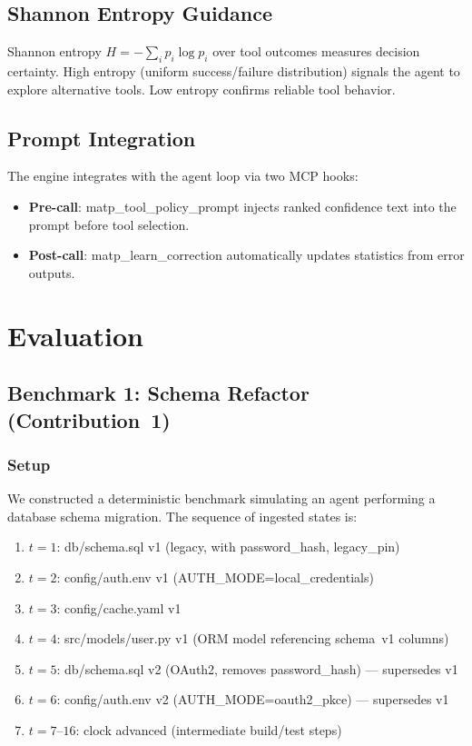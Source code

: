 \documentclass[lettersize,journal]{IEEEtran}
\begin{document}
\subsection{Shannon Entropy Guidance}

Shannon entropy $H = -\sum_i p_i \log p_i$ over tool outcomes measures decision certainty. High entropy (uniform success/failure distribution) signals the agent to explore alternative tools. Low entropy confirms reliable tool behavior.

\subsection{Prompt Integration}

The engine integrates with the agent loop via two MCP hooks:
\begin{itemize}
    \item \textbf{Pre-call}: matp\_tool\_policy\_prompt injects ranked confidence text into the prompt before tool selection.
    \item \textbf{Post-call}: matp\_learn\_correction automatically updates statistics from error outputs.
\end{itemize}

\section{Evaluation}

\subsection{Benchmark 1: Schema Refactor (Contribution~1)}

\subsubsection{Setup}
We constructed a deterministic benchmark simulating an agent performing a database schema migration. The sequence of ingested states is:

\begin{enumerate}
    \item $t=1$: db/schema.sql v1 (legacy, with password\_hash, legacy\_pin)
    \item $t=2$: config/auth.env v1 (AUTH\_MODE=local\_credentials)
    \item $t=3$: config/cache.yaml v1
    \item $t=4$: src/models/user.py v1 (ORM model referencing schema~v1 columns)
    \item $t=5$: db/schema.sql v2 (OAuth2, removes password\_hash) — supersedes v1
    \item $t=6$: config/auth.env v2 (AUTH\_MODE=oauth2\_pkce) — supersedes v1
    \item $t=7$--$16$: clock advanced (intermediate build/test steps)
\end{enumerate}
\end{document}
